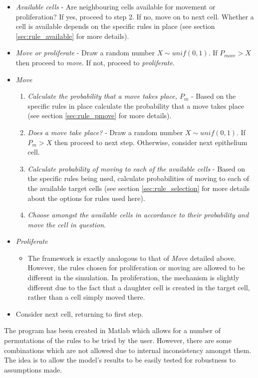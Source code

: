 \documentclass[pdftex,10pt,a4paper]{article}
\begin{document}
\begin{itemize}
\item \textit{Available cells} - Are neighbouring cells available for movement or proliferation? If yes, proceed to step 2. If no, move on to next cell. Whether a cell is available depends on the specific rules in place (see section \ref{sec:rule_available} for more details).
\item \textit{Move or proliferate} - Draw a random number $X\sim unif(0,1)$. If $P_{move}>X$ then proceed to \textit{move}. If not, proceed to \textit{proliferate}.
\item \textit{Move} 
\begin{enumerate}
\item \textit{Calculate the probability that a move takes place, $P_m$} - Based on the specific rules in place calculate the probability that a move takes place (see section \ref{sec:rule_pmove} for more details).
\item \textit{Does a move take place?} - Draw a random number $X\sim unif(0,1)$. If $P_{m}>X$ then proceed to next step. Otherwise, consider next epithelium cell.
\item \textit{Calculate probability of moving to each of the available cells} - Based on the specific rules being used, calculate probabilities of moving to each of the available target cells (see section \ref{sec:rule_selection} for more details about the options for rules used here). 
\item \textit{Choose amongst the available cells in accordance to their probability and move the cell in question}.
\end{enumerate} 
\item \textit{Proliferate}
\begin{itemize}
\item The framework is exactly analogous to that of \textit{Move} detailed above. However, the rules chosen for proliferation or moving are allowed to be different in the simulation. In proliferation, the mechanism is slightly different due to the fact that a daughter cell is created in the target cell, rather than a cell simply moved there.
\end{itemize}
\item Consider next cell, returning to first step.
\end{itemize}

The program has been created in Matlab which allows for a number of permutations of the rules to be tried by the user. However, there are some combinations which are not allowed due to internal inconsistency amongst them. The idea is to allow the model's results to be easily tested for robustness to assumptions made.
\end{document}
